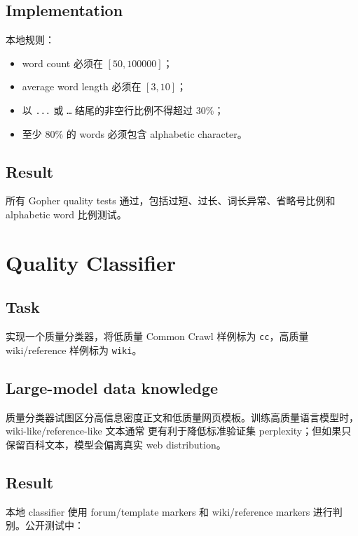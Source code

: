\documentclass[UTF8,11pt]{ctexart}
\begin{document}
\subsection*{Implementation}

本地规则：

\begin{itemize}
  \item word count 必须在 $[50, 100000]$；
  \item average word length 必须在 $[3, 10]$；
  \item 以 \texttt{...} 或 \texttt{…} 结尾的非空行比例不得超过 30\%；
  \item 至少 80\% 的 words 必须包含 alphabetic character。
\end{itemize}

\subsection*{Result}

所有 Gopher quality tests 通过，包括过短、过长、词长异常、省略号比例和 alphabetic word 比例测试。

\section{Quality Classifier}

\subsection*{Task}

实现一个质量分类器，将低质量 Common Crawl 样例标为 \texttt{cc}，高质量 wiki/reference 样例标为
\texttt{wiki}。

\subsection*{Large-model data knowledge}

质量分类器试图区分高信息密度正文和低质量网页模板。训练高质量语言模型时，wiki-like/reference-like 文本通常
更有利于降低标准验证集 perplexity；但如果只保留百科文本，模型会偏离真实 web distribution。

\subsection*{Result}

本地 classifier 使用 forum/template markers 和 wiki/reference markers 进行判别。公开测试中：
\end{document}
